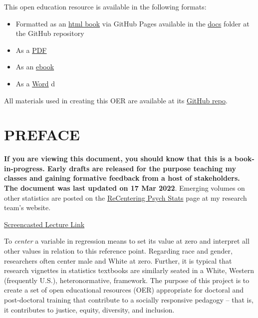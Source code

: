 \documentclass[
  11pt,
]{book}
\providecommand{\tightlist}{%
  \setlength{\itemsep}{0pt}\setlength{\parskip}{0pt}}
\begin{document}
This open education resource is available in the following formats:

\begin{itemize}
\tightlist
\item
  Formatted as an \href{https://lhbikos.github.io/MultilevelModeling/}{html book} via GitHub Pages available in the \href{https://github.com/lhbikos/MultilevelModeling/tree/main/docs}{docs} folder at the GitHub repository
\item
  As a \href{https://github.com/lhbikos/MultilevelModeling/blob/main/docs/ReC_MultMod.pdf}{PDF}
\item
  As an \href{https://github.com/lhbikos/MultilevelModeling/blob/main/docs/ReC_MultMod.epub}{ebook}
\item
  As a \href{https://github.com/lhbikos/MultilevelModeling/blob/main/docs/ReC_MultMod.docx}{Word} d
\end{itemize}

All materials used in creating this OER are available at its \href{https://github.com/lhbikos/MultilevelModeling}{GitHub repo}.

\hypertarget{preface}{%
\chapter*{PREFACE}\label{preface}}

\textbf{If you are viewing this document, you should know that this is a book-in-progress. Early drafts are released for the purpose teaching my classes and gaining formative feedback from a host of stakeholders. The document was last updated on 17 Mar 2022}. Emerging volumes on other statistics are posted on the \href{https://lhbikos.github.io/BikosRVT/ReCenter.html}{ReCentering Psych Stats} page at my research team's website.

\href{https://spu.hosted.panopto.com/Panopto/Pages/Viewer.aspx?id=c932455e-ef06-444a-bdca-acf7012d759a}{Screencasted Lecture Link}

To \emph{center} a variable in regression means to set its value at zero and interpret all other values in relation to this reference point. Regarding race and gender, researchers often center male and White at zero. Further, it is typical that research vignettes in statistics textbooks are similarly seated in a White, Western (frequently U.S.), heteronormative, framework. The purpose of this project is to create a set of open educational resources (OER) appropriate for doctoral and post-doctoral training that contribute to a socially responsive pedagogy -- that is, it contributes to justice, equity, diversity, and inclusion.
\end{document}
